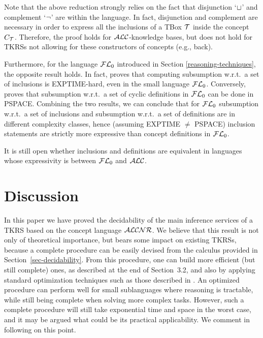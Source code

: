 Note that the above reduction strongly relies on the fact that disjunction
`$\sqcup$' and complement `$\neg$' are within the language. In fact, disjunction
and complement are necessary in order to express all the inclusions of a TBox
${\cal T}$ inside the concept $C_{\cal T}$.  Therefore, the proof holds for
${\cal ALC}$-knowledge bases, but does not hold for TKRSs not allowing for these
constructors of concepts (e.g., {\sc back}).

Furthermore, for the language ${\cal FL}_0$ introduced in Section
\ref{reasoning-techniques}, the opposite result holds.  In fact, 
proves that computing subsumption w.r.t.\ a set of inclusions is EXPTIME-hard,
even in the small language ${\cal FL}_0$.  Conversely,  proves that
subsumption w.r.t.\ a set of cyclic definitions in ${\cal FL}_0$ can be done in
PSPACE.  Combining the two results, we can conclude that for ${\cal FL}_0$
subsumption w.r.t.\ a set of inclusions and subsumption w.r.t.\ a set of
definitions are in different complexity classes, hence (assuming EXPTIME $\neq$
PSPACE) inclusion statements are strictly more expressive than concept
definitions in ${\cal FL}_0$.

It is still open whether inclusions and definitions are equivalent in languages
whose expressivity is between ${\cal FL}_0$ and ${\cal ALC}$.

\section{Discussion}\label{sec-conclusions}

In this paper we have proved the decidability of the main inference services of
a TKRS based on the concept language ${\cal ALCNR}$. We believe that this result is
not only of theoretical importance, but bears some impact on
existing TKRSs, because  a complete procedure can be easily devised from the
calculus provided in Section~\ref{sec-decidability}. From this procedure, one
can build more efficient (but still complete) ones, as described at the end of
Section~3.2, and also by applying standard optimization techniques such as those
described in \cite{BHNPF92}. An optimized procedure can perform well for small
sublanguages where reasoning is tractable, while still being complete when
solving more complex tasks. However, such a complete procedure will still take
exponential time and space in the worst case, and it may be argued what could be its practical
applicability. We comment in following on this point.

